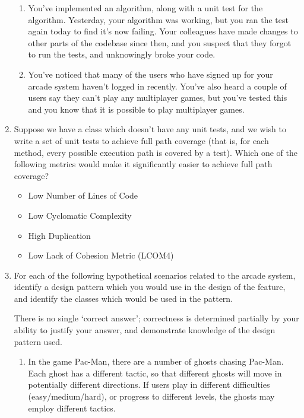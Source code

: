 \documentclass[a4paper,11pt]{article}
\begin{document}
\begin{enumerate}
\begin{enumerate}
\item
You've implemented an algorithm, along with a unit test for the algorithm.
Yesterday, your algorithm was working, but you ran the test again today to find
it's now failing. Your colleagues have made changes to other parts of the
codebase since then, and you suspect that they forgot to run the tests, and
unknowingly broke your code.

\item
You've noticed that many of the users who have signed up for your arcade system
haven't logged in recently. You've also heard a couple of users say they can't
play any multiplayer games, but you've tested this and you know that it is
possible to play multiplayer games.
\end{enumerate}

\newpage

\item
Suppose we have a class which doesn't have any unit tests, and we wish to write
a set of unit tests to achieve full path coverage (that is, for each method,
every possible execution path is covered by a test). Which one of the following
metrics would make it significantly easier to achieve full path coverage?
\begin{itemize}
\item Low Number of Lines of Code
\item Low Cyclomatic Complexity
\item High Duplication
\item Low Lack of Cohesion Metric (LCOM4)
\end{itemize}

\item
For each of the following hypothetical scenarios related to the arcade system,
identify a design pattern which you would use in the design of the feature,
and identify the classes which would be used in the pattern.

There is no single `correct answer'; correctness is
determined partially by your ability to justify your answer, and demonstrate
knowledge of the design pattern used.
\begin{enumerate}
\item
In the game Pac-Man, there are a number of ghosts chasing Pac-Man.
Each ghost has a different tactic, so that different ghosts will move in
potentially different directions. If users play in different difficulties
(easy/medium/hard), or progress to different levels, the ghosts may employ
different tactics.


\end{enumerate}
\end{enumerate}
\end{document}
